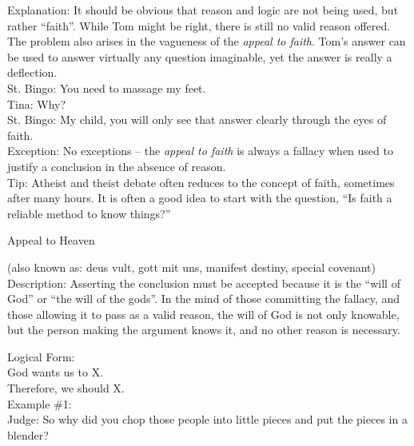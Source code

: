 \documentclass[a4paper,12pt,single,pdftex]{scrartcl}
\begin{document}
{    
      Explanation: It should be obvious that reason and logic are not being used, but rather “faith”.  While Tom might be right, there is still no valid reason offered.  The problem also arises in the vagueness of the {\it appeal to faith}.  Tom’s answer can be used to answer virtually any question imaginable, yet the answer is really a deflection.
    \\

    
      St. Bingo: You need to massage my feet.
    \\

    
      Tina: Why?
    \\

    
      St. Bingo: My child, you will only see that answer clearly through the eyes of faith.
    \\

    
      Exception: No exceptions -- the {\it appeal to faith} is always a fallacy when used to justify a conclusion in the absence of reason.
    \\

    
      Tip: Atheist and theist debate often reduces to the concept of faith, sometimes after many hours. It is often a good idea to start with the question, “Is faith a reliable method to know things?” 
    \\

  }


Appeal to Heaven
    
      (also known as: deus vult, gott mit uns, manifest destiny, special covenant)
    \\

  
    Description: Asserting the conclusion must be accepted because it is the “will of God” or “the will of the gods”.  In the mind of those committing the fallacy, and those allowing it to pass as a valid reason, the will of God is not only knowable, but the person making the argument knows it, and no other reason is necessary.

    
      Logical Form:
    \\

    
      God wants us to X.
    \\

    
      Therefore, we should X.
    \\

    
      Example \#1:
    \\

    
      Judge: So why did you chop those people into little pieces and put the pieces in a blender?
    \\
\end{document}
